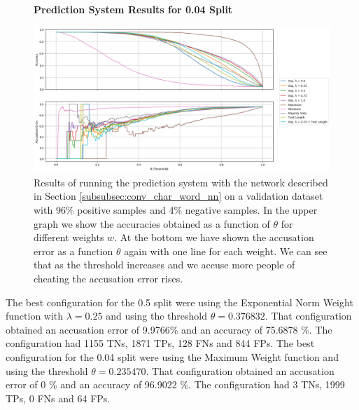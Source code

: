 \begin{figure}
    \centering
    \textbf{Prediction System Results for 0.04 Split}\par\medskip
    \includegraphics[width=\textwidth]{./pictures/experiments/conv_char_word_nn/prediction_system_04.png}
    \caption{Results of running the prediction system with the network described
        in Section \ref{subsubsec:conv_char_word_nn} on a validation dataset
        with 96\% positive samples and 4\% negative samples. In the upper graph
        we show the accuracies obtained as a function of $\theta$ for different
        weights $w$. At the bottom we have shown the accusation error as a
        function $\theta$ again with one line for each weight. We can see that
        as the threshold increases and we accuse more people of cheating the
        accusation error rises.}
    \label{fig:conv-char-word-NN-pred-4}
\end{figure}

The best configuration for the 0.5 split were using the Exponential Norm Weight
function with $\lambda = 0.25$ and using the threshold $\theta = 0.376832$.
That configuration obtained an accusation error of 9.9766\% and an accuracy of
75.6878 \%. The configuration had 1155 \gls{TN}s, 1871 \gls{TP}s, 128 \gls{FN}s
and 844 \gls{FP}s. The best configuration for the 0.04 split were using the
Maximum Weight function and using the threshold $\theta = 0.235470$. That
configuration obtained an accusation error of 0 \% and an accuracy of 96.9022
\%. The configuration had 3 \gls{TN}s, 1999 \gls{TP}s, 0 \gls{FN}s and 64
\gls{FP}s.
